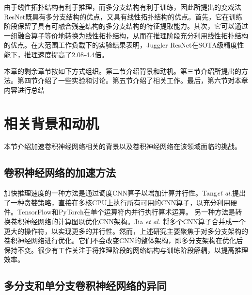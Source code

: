 由于线性拓扑结构有利于推理，而多分支结构有利于训练，因此所提出的变戏法ResNet既具有多分支结构的优点，又具有线性拓扑结构的优点。首先，它在训练阶段保留了具有可融合残差结构的多分支结构的特征提取能力。其次，它可以通过一组融合算子等价地转换为线性拓扑结构，从而在推理阶段充分利用线性拓扑结构的优点。在大范围工作负载下的实验结果表明，Juggler ResNet在SOTA级精度性能下，推理速度提高了2.08-4.4倍。

本章的剩余章节按如下方式组织。第二节介绍背景和动机。第三节介绍所提出的方法。第四节介绍了一些实验和讨论。第五节介绍了相关工作。最后，第六节对本章内容进行总结

\section{相关背景和动机}
本节介绍加速卷积神经网络相关的背景以及卷积神经网络在该领域面临的挑战。


\subsection{卷积神经网络的加速方法}
加快推理速度的一种方法是通过调度CNN算子以增加计算并行性。Tang\textit{et al.}\cite{2018Optimizing}提出了一种贪婪策略，直接在多核CPU上执行所有可用的CNN算子，以充分利用硬件。TensorFlow和PyTorch在单个运算符内并行执行算术运算。
另一种方法是转换卷积神经网络的计算图以优化CNN架构。Jia \textit{et al.} \cite{0OPTIMIZING} 将多个CNN算子合并成一个更大的操作符，以实现更多的并行性。然而，上述研究主要聚焦于对多分支架构的卷积神经网络进行优化。它们不会改变CNN的整体架构，即多分支架构在优化后保持不变。很少有工作关注于将推理阶段的网络结构与训练阶段解耦，以提高推理效率。

\subsection{多分支和单分支卷积神经网络的异同}
